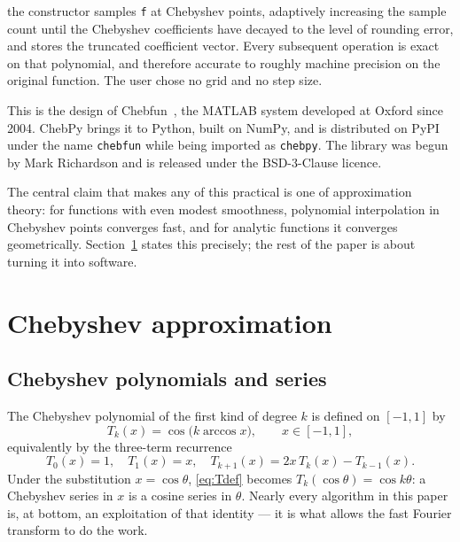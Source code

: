 \documentclass[11pt,a4paper]{article}
\newcommand{\cheb}[1]{T_{#1}}
\newcommand{\code}[1]{\texttt{#1}}
\begin{document}
\noindent
the constructor samples \code{f} at Chebyshev points, adaptively increasing the
sample count until the Chebyshev coefficients have decayed to the level of
rounding error, and stores the truncated coefficient vector. Every subsequent
operation is exact on that polynomial, and therefore accurate to roughly
machine precision on the original function. The user chose no grid and no step
size.

This is the design of Chebfun~\cite{chebfun,driscoll2014}, the MATLAB system
developed at Oxford since 2004. ChebPy brings it to Python, built on NumPy, and
is distributed on PyPI under the name \code{chebfun} while being imported as
\code{chebpy}. The library was begun by Mark Richardson and is released under
the BSD-3-Clause licence.

The central claim that makes any of this practical is one of approximation
theory: for functions with even modest smoothness, polynomial interpolation in
Chebyshev points converges fast, and for analytic functions it converges
geometrically. Section~\ref{sec:approx} states this precisely; the rest of the
paper is about turning it into software.

\section{Chebyshev approximation}
\label{sec:approx}

\subsection{Chebyshev polynomials and series}

The Chebyshev polynomial of the first kind of degree $k$ is defined on
$[-1,1]$ by
\begin{equation}
  \cheb{k}(x) = \cos\!\bigl(k \arccos x\bigr), \qquad x \in [-1, 1],
  \label{eq:Tdef}
\end{equation}
equivalently by the three-term recurrence
\begin{equation}
  \cheb{0}(x) = 1, \quad \cheb{1}(x) = x, \quad
  \cheb{k+1}(x) = 2x\,\cheb{k}(x) - \cheb{k-1}(x).
  \label{eq:Trec}
\end{equation}
Under the substitution $x = \cos\theta$, \eqref{eq:Tdef} becomes
$\cheb{k}(\cos\theta) = \cos k\theta$: a Chebyshev series in $x$ is a cosine
series in $\theta$. Nearly every algorithm in this paper is, at bottom, an
exploitation of that identity --- it is what allows the fast Fourier transform
to do the work.
\end{document}
